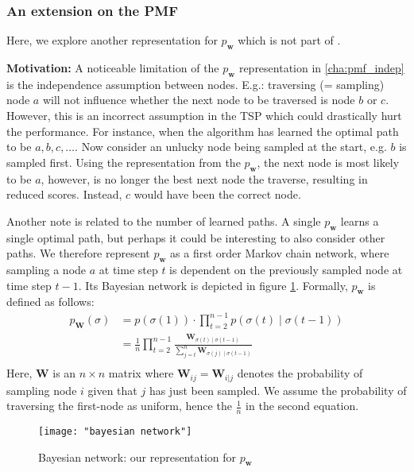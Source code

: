 \documentclass[a4paper,10pt]{article}
\newcommand{\matr}[1]{\mathbf{#1}}
\begin{document}
	\subsubsection{An extension on the PMF}
	Here, we explore another representation for $p_\mathbf{w}$ which is not part of \cite{santucci_gradient_2020, ceberiojosu_model-based_2023}. 
	
	\textbf{Motivation:} A noticeable limitation of the $p_\mathbf{w}$ representation in \ref{cha:pmf_indep} is the independence assumption between nodes. E.g.: traversing (= sampling) node $a$ will not influence whether the next node to be traversed is node $b$ or $c$. However, this is an incorrect assumption in the TSP which could drastically hurt the performance. For instance, when the algorithm has learned the optimal path to be $a, b, c, \dots $. Now consider an unlucky node being sampled at the start, e.g. $b$ is sampled first. Using the representation from the $p_\mathbf{w}$, the next node is most likely to be $a$, however, is no longer the best next node the traverse, resulting in reduced scores. Instead, $c$ would have been the correct node.
	
	Another note is related to the number of learned paths. A single $p_\mathbf{w}$ learns a single optimal path, but perhaps it could be interesting to also consider other paths. We therefore represent $p_\mathbf{w}$ as a first order Markov chain network, where sampling a node $a$ at time step $t$ is dependent on the previously sampled node at time step $t-1$. Its Bayesian network is depicted in figure \ref{fig:bayesian-network}. Formally, $p_\matr{w}$ is defined as follows:
	$$
	\begin{aligned}
		p_\matr{W}(\sigma) &= p\left(\sigma(1)\right) \cdot \prod_{t=2}^{n-1} p\left(\sigma(t) \mid \sigma(t-1) \right) \\
						   &= \frac{1}{n} \prod_{t=2}^{n-1} \frac{\matr{W}_{\sigma(t) \mid \sigma(t-1)}}{\sum_{j=t}^n \matr{W}_{\sigma(j) \mid \sigma(t-1)}} \\
	\end{aligned}
	$$
	Here, $\matr{W}$ is an $n \times n$ matrix where $\matr{W}_{ij} = \matr{W}_{i | j}$ denotes the probability of sampling node $i$ given that $j$ has just been sampled. We assume the probability of traversing the first-node as uniform, hence the $\frac{1}{n}$ in the second equation.
	
	\begin{figure}
		\centering
		\texttt{[image: "bayesian network"]}
		\caption{Bayesian network: our representation for $p_\mathbf{w}$}
		\label{fig:bayesian-network}
	\end{figure}
	
\end{document}
